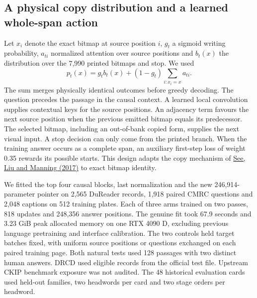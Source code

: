 \subsection*{A physical copy distribution and a learned whole-span action}
Let $x_i$ denote the exact bitmap at source position $i$, $g_t$ a sigmoid writing probability, $a_{ti}$ normalized attention over source positions and $b_t(x)$ the distribution over the 7,990 printed bitmaps and stop. We used
\[
  p_t(x)=g_t b_t(x)+(1-g_t)\sum_{i:x_i=x}a_{ti}.
\]
The sum merges physically identical outcomes before greedy decoding. The question precedes the passage in the causal context. A learned local convolution supplies contextual keys for the source positions. An adjacency term favours the next source position when the previous emitted bitmap equals its predecessor. The selected bitmap, including an out-of-bank copied form, supplies the next visual input. A stop decision can only come from the printed branch. When the training answer occurs as a complete span, an auxiliary first-step loss of weight 0.35 rewards its possible starts. This design adapts the copy mechanism of \href{https://aclanthology.org/P17-1099/}{See, Liu and Manning (2017)} to exact bitmap identity.

We fitted the top four causal blocks, last normalization and the new 246,914-parameter pointer on 2,565 DuReader records, 1,918 paired CMRC questions and 2,048 captions on 512 training plates. Each of three arms trained on two passes, 818 updates and 248,356 answer positions. The genuine fit took 67.9 seconds and 3.23 GiB peak allocated memory on one RTX 4090 D, excluding previous language pretraining and interface calibration. The two controls held target batches fixed, with uniform source positions or questions exchanged on each paired training page. Both natural tests used 128 passages with two distinct human answers. DRCD used eligible records from the official test file. Upstream CKIP benchmark exposure was not audited. The 48 historical evaluation cards used held-out families, two headwords per card and two stage orders per headword.

